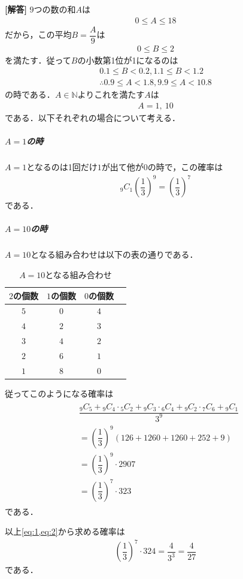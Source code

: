 \documentclass[../../main.tex]{subfiles}
\begin{document}
\begin{oframed}
  
\end{oframed}

{\bf [解答]}
$9$つの数の和$A$は
\begin{align}
  0 \le A \le 18
\end{align}
だから，この平均$B=\dfrac{A}{9}$は
\begin{align}
  0 \le B \le 2
\end{align}
を満たす．従って$B$の小数第1位が1になるのは
\begin{align}
  0.1\le B<0.2, 1.1\le B<1.2 \\
  \therefore
  0.9\le A<1.8, 9.9\le A<10.8
\end{align}
の時である．$A\in\mathbb{N}$よりこれを満たす$A$は
\begin{align}
  A = 1,\ 10
\end{align}
である．以下それぞれの場合について考える．

\subparagraph{$A=1$の時}

$A=1$となるのは1回だけ$1$が出て他が$0$の時で，この確率は
\begin{align}
  {}_{9}C_{1} \left(\dfrac{1}{3}\right)^9=\left(\dfrac{1}{3}\right)^7 \label{eq:1}
\end{align}
である．

\subparagraph{$A=10$の時}

$A=10$となる組み合わせは以下の表の通りである．
\begin{table}[htb]
  \begin{center}
    \caption{$A=10$となる組み合わせ}
    \begin{tabular}{c|c|c|c}
      $2$の個数 & $1$の個数 & $0$の個数 & \\
      \hline
      $5$ & $0$ & $4$ & \\
      $4$ & $2$ & $3$ & \\
      $3$ & $4$ & $2$ & \\
      $2$ & $6$ & $1$ & \\
      $1$ & $8$ & $0$ &
    \end{tabular}
  \end{center}
\end{table}
従ってこのようになる確率は
\begin{align}
  \begin{split}
    &\dfrac{{}_9C_5+{}_9C_4\cdot{}_5C_2+{}_9C_3\cdot{}_6C_4+{}_9C_2\cdot{}_7C_6+{}_9C_1}{3^9} \\
    &=\left(\dfrac{1}{3}\right)^9(126+1260+1260+252+9) \\
    &=\left(\dfrac{1}{3}\right)^9\cdot 2907 \\
    &=\left(\dfrac{1}{3}\right)^7\cdot 323
  \end{split} \label{eq:2}
\end{align}
である．
\casesend

以上\cref{eq:1,eq:2}から求める確率は
\begin{align}
  \left(\dfrac{1}{3}\right)^7\cdot324=\dfrac{4}{3^3}=\dfrac{4}{27}
\end{align}
である．
\end{document}
